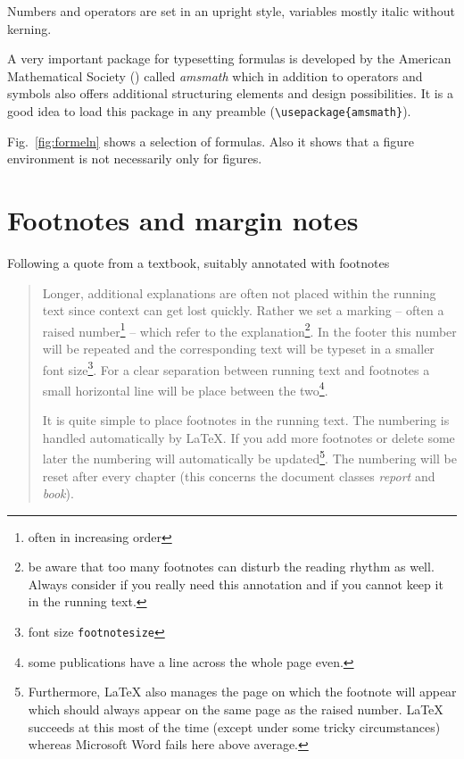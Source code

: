 \documentclass[11pt, a4paper]{article}
\newcommand{\ltx}{\LaTeX}
\let\oldmarginpar\marginpar
\renewcommand{\marginpar}[1]{\oldmarginpar{\textit{#1}}}
\begin{document}
Numbers and operators are set in an upright style, variables mostly italic without kerning.

A very important package for typesetting formulas is developed by the American Mathematical Society (\AmS) called \textit{amsmath} which in addition to operators and symbols also offers additional structuring elements and design possibilities. It is a good idea to load this package in any preamble (\verb+\usepackage{amsmath}+).

Fig.~\ref{fig:formeln} shows a selection of formulas. Also it shows that a figure environment is not necessarily only for figures.

\clearpage %

\section{Footnotes and margin notes}

Following a quote from a textbook, suitably annotated with footnotes\marginpar{Footnotes}

\begin{quote}
Longer, additional explanations are often not placed within the running text since context can get lost quickly. Rather we set a marking -- often a raised number\footnote{often in increasing order} -- which refer to the explanation\footnote{be aware that too many footnotes can disturb the reading rhythm as well. Always consider if you really need this annotation and if you cannot keep it in the running text.}. In \cite{lkgt} the footer this number will be repeated and the corresponding text will be typeset in a smaller font size\footnote{font size \texttt{footnotesize}}. For a clear separation between running text and footnotes a small horizontal line will be place between the two\footnote{some publications have a line across the whole page even.}.

It is quite simple to place footnotes in the running text. The numbering is handled automatically by \ltx{}. If you add more footnotes or delete some later the numbering will automatically be updated\footnote{Furthermore, \ltx{} also manages the page on which the footnote will appear which should always appear on the same page as the raised number. \ltx{} succeeds at this most of the time (except under some tricky circumstances) whereas Microsoft Word fails here above average.}. The numbering will be reset after every chapter (this concerns the document classes \textit{report} and \textit{book}). 

\end{quote}
\end{document}
